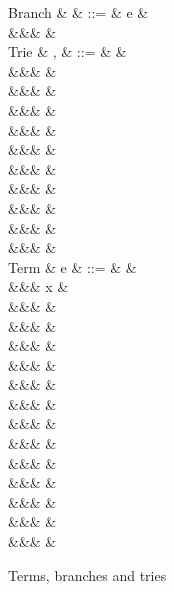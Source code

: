 \begin{figure}
\begin{syntaxfig}
\mbox{Branch}
&
\kappa
&
::=
&
e
&
\\
&&&
\sigma
&
\\[2mm]
\mbox{Trie}
&
\sigma, \tau
&
::=
&
&
\\
&&&
&
\\
&&&
\trieUnit{\kappa}
&
\\
&&&
\trieUnitProj{\kappa}
&
\\
&&&
\trieSum{\sigma}{\tau}
&
\\
&&&
\trieSumProjL{\sigma}{\tau}
&
\\
&&&
\trieSumProjR{\sigma}{\tau}
&
\\
&&&
\trieProd{\sigma}
&
\\
&&&
\trieProdProj{\sigma}
&
\\
&&&
\trieRoll{\sigma}
&
\\
&&&
\trieRollProj{\sigma}
&
\\[2mm]
\mbox{Term}
&
e
&
::=
&
&
\\
&&&
x
&
\\
&&&
\exUnit
&
\\
&&&
&
\\
&&&
&
\\
&&&
&
\\
&&&
&
\\
&&&
&
\\
&&&
&
\\
&&&
&
\\
&&&
\exFun{\sigma}
&
\\
&&&
&
\\
&&&
&
\\
&&&
&
\\
&&&
&
\end{syntaxfig}
\caption{Terms, branches and tries}
\end{figure}
